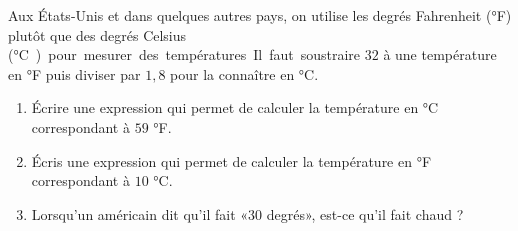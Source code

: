 
\begin{exercice}\label{exosmath-0734}

Aux États-Unis et dans quelques autres pays, on utilise les degrés Fahrenheit (°F) plutôt que des degrés Celsius (\si\degreeCelsius) pour mesurer des températures. Il faut soustraire $32$ à une température en °F puis diviser par $1,8$ pour la connaître en °C.  

\begin{enumerate}
    \item
Écrire une expression qui permet de calculer la température en °C correspondant à $59$ °F.
\item
Écris une expression qui permet de calculer la température en °F correspondant à $10$ °C.
\item
    Lorsqu'un américain dit qu'il fait «\( 30\) degrés», est-ce qu'il fait chaud ?
\end{enumerate}

\end{exercice}
